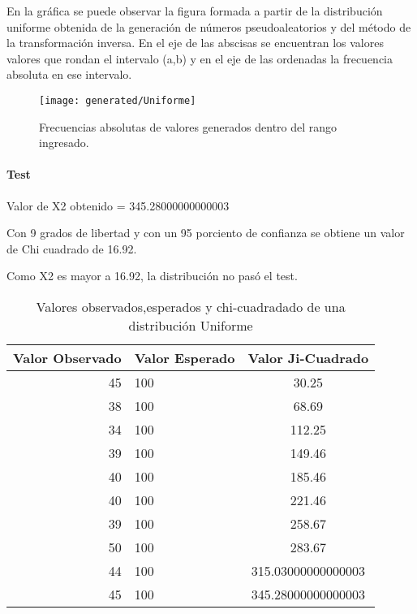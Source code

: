 \documentclass{article}
\begin{document}
    En la gráfica se puede observar la figura formada a partir de la distribución uniforme obtenida de
    la generación de números pseudoaleatorios y del método de la transformación inversa.
    En el eje de las abscisas se encuentran los valores valores que rondan el intervalo (a,b) y en el
    eje de las ordenadas la frecuencia absoluta en ese intervalo.
    \begin{figure}[h]
      \centering
      \texttt{[image: generated/Uniforme]}
      \caption{Frecuencias absolutas de valores generados dentro del rango ingresado.}\label{fig:figure}
    \end{figure}
    \newpage



  \paragraph{Test\newline}


  Valor de X2 obtenido = 345.28000000000003

  Con 9 grados de libertad y con un 95 porciento de confianza se obtiene un valor de Chi cuadrado de 16.92.

  Como X2 es mayor a 16.92, la distribución no pasó el test.

  \begin{table*}
    \begin{center}
      \begin{tabular}{| r | l | c |} \hline
      Valor Observado & Valor Esperado &  Valor Ji-Cuadrado \\ \hline
      45 & 100 & 30.25 \\
      38 & 100 & 68.69 \\
      34 & 100 & 112.25 \\
      39 & 100 & 149.46 \\
      40 & 100 & 185.46 \\
      40 & 100 & 221.46 \\
      39 & 100 & 258.67 \\
      50 & 100 & 283.67 \\
      44 & 100 & 315.03000000000003 \\
      45 & 100 & 345.28000000000003 \\ \hline
      \end{tabular}
      \caption{Valores observados,esperados y chi-cuadradado de una distribución Uniforme}
    \end{center}
  \end{table*}
\end{document}
